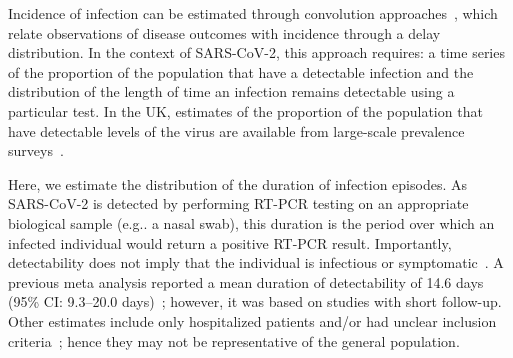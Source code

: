 \documentclass[referee,useAMS,usenatbib]{biom}
\makeatletter
\DeclareRobustCommand\onedot{\futurelet\@let@token\@onedot}
\def\@onedot{\ifx\@let@token.\else.\null\fi\xspace}
\def\eg{e.g\onedot} \def\Eg{{E.g}\onedot}
\def\ie{i.e\onedot} \def\Ie{{I.e}\onedot}
\makeatother
\begin{document}
Incidence of infection can be estimated through convolution approaches~\citep[e.g.][]{brookmeyerBackcalculation},  which relate observations of disease outcomes with incidence through a delay distribution.
In the context of SARS-CoV-2, this approach requires: a time series of the proportion of the population that have a detectable infection and the distribution of the length of time an infection remains detectable using a particular test.
In the UK, estimates of the proportion of the population that have detectable levels of the virus are available from large-scale prevalence surveys~\citep{cisMethodsONS,rileyREACT}.

Here, we estimate the distribution of the duration of infection episodes.
As SARS-CoV-2 is detected by performing RT-PCR testing on an appropriate biological sample (\eg a nasal swab), this duration is the period over which an infected individual would return a positive RT-PCR result.
Importantly, detectability does not imply that the individual is infectious or symptomatic~\citep{puhachSARSCoV2}.
A previous meta analysis reported a mean duration of detectability of 14.6 days (95\% CI: 9.3--20.0 days)~\citep{cevikShedding}; however, it was based on studies with short follow-up.
Other estimates include only hospitalized patients and/or had unclear inclusion criteria~\citep{ealesCharacterising,hellewellPCRSensitivity}; hence they may not be representative of the general population.

\end{document}
